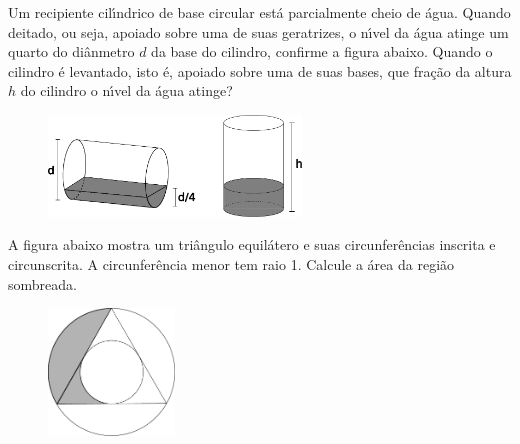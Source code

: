 \documentclass{prova}
\begin{document}
	\begin{questionario}
        \item Um recipiente cil\'{\i}ndrico de base circular est\'a parcialmente cheio de
            \'agua. Quando deitado, ou seja, apoiado sobre uma de suas geratrizes, o
            n\'{\i}vel da \'agua atinge um quarto do di\^anmetro $d$ da base do cilindro,
            confirme a figura abaixo. Quando o cilindro \'e levantado, isto \'e,
            apoiado sobre uma de suas bases, que fra\c{c}\~ao da altura $h$ do cilindro o
            n\'{\i}vel da \'agua atinge?
            \begin{figure}[h]
                \centering
                \includegraphics[width=0.6\textwidth]{fig01.pdf}
            \end{figure}

        \item A figura abaixo mostra um tri\^angulo equil\'atero e suas
            circunfer\^encias inscrita e circunscrita. A circunfer\^encia menor tem
            raio 1. Calcule a \'area da regi\~ao sombreada.
            \begin{figure}[h]
                \centering
                \includegraphics[width=0.3\textwidth]{fig02.pdf}
            \end{figure}
	\end{questionario}
\end{document}
